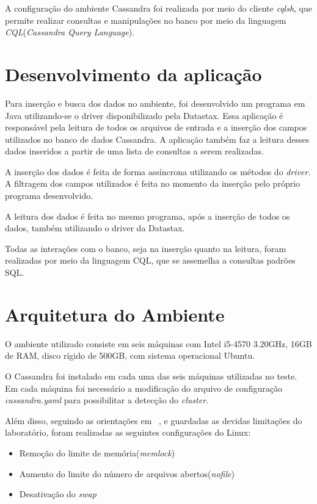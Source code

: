 A configuração do ambiente Cassandra foi realizada por meio do cliente \emph{cqlsh}, que permite realizar consultas e manipulações no banco por meio da linguagem \emph{CQL}(\emph{Cassandra Query Language}).

\section{Desenvolvimento da aplicação}
Para inserção e busca dos dados no ambiente, foi desenvolvido um programa em Java utilizando-se o driver disponibilizado pela Datastax. Essa aplicação é responsável pela leitura de todos os arquivos de entrada e a inserção dos campos utilizados no banco de dados Cassandra. A aplicação também faz a leitura desses dados inseridos a partir de uma lista de consultas a serem realizadas.

A inserção dos dados é feita de forma assíncrona utilizando os métodos do \emph{driver}. A filtragem dos campos utilizados é feita no momento da inserção pelo próprio programa desenvolvido.

A leitura dos dados é feita no mesmo programa, após a inserção de todos os dados, também utilizando o driver da Datastax.

Todas as interações com o banco, seja na inserção quanto na leitura, foram realizadas por meio da linguagem CQL, que se assemelha a consultas padrões SQL.

\section{Arquitetura do Ambiente}
O ambiente utilizado consiste em seis máquinas com Intel i5-4570 3.20GHz, 16GB de RAM, disco rígido de 500GB, com sistema operacional Ubuntu.

O Cassandra foi instalado em cada uma das seis máquinas utilizadas no teste. Em cada máquina foi necessário a modificação do arquivo de configuração \emph{cassandra.yaml} para possibilitar a detecção do \emph{cluster}.

Além disso, seguindo as orientações em ~\cite{cassandrasettings}, e guardadas as devidas limitações do laboratório, foram realizadas as seguintes configurações do Linux:
\begin{itemize}
	\item Remoção do limite de memória(\emph{memlock})
	\item Aumento do limite do número de arquivos abertos(\emph{nofile})
	\item Desativação do \emph{swap}
\end{itemize}




